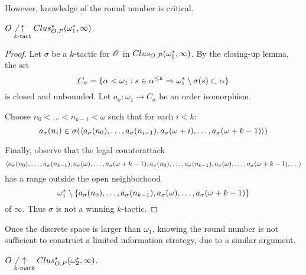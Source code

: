 However, knowledge of the round number is critical.

\begin{thm}
  $O\not\underset{k\text{-tact}}{\uparrow}Clus_{O,P}^\star(\omega^*_1,\infty)$.
\end{thm}

\begin{proof}
  Let $\sigma$ be a $k$-tactic for $\mathscr{O}$ in
  $Clus_{O,P}(\omega^*_1,\infty)$. By the closing-up lemma, the set
    \[
      C_\sigma
        =
      \{
        \alpha<\omega_1
          :
        s\in\alpha^{\leq k}
          \Rightarrow
        \omega^*_1\setminus\sigma(s)
        \subset \alpha
      \}
    \]
  is closed and unbounded. Let $a_\sigma:\omega_1\to C_\sigma$ be an order
  isomorphism.

  Choose $n_0<\dots<n_{k-1}<\omega$ such that for each $i<k$:
    \[
      a_\sigma(n_i)
        \in
      \sigma(
        \langle a_\sigma(n_0),\dots,a_\sigma(n_{i-1}),
          a_\sigma(\omega+i),\dots,a_\sigma(\omega+k-1)\rangle
      )
    \]

  Finally, observe that the legal counterattack
    \[
      \<a_\sigma(n_0),\dots,a_\sigma(n_{k-1}),
        a_\sigma(\omega),\dots,a_\sigma(\omega+k-1),
        a_\sigma(n_0),\dots,a_\sigma(n_{k-1}),
        a_\sigma(\omega),\dots,a_\sigma(\omega+k-1),
        \dots\>
    \]
  has a range outside the open neighborhood
    \[
      \omega^*_1
        \setminus
      \{a_\sigma(n_0),\dots,a_\sigma(n_{k-1}),
        a_\sigma(\omega),\dots,a_\sigma(\omega+k-1)\}
    \]
  of $\infty$. Thus $\sigma$ is not a winning $k$-tactic.
\end{proof}

Once the discrete space is larger than $\omega_1$, knowing the round number
is not sufficient to construct a limited information strategy, due to a
similar argument.

\begin{thm}
  $O\not\underset{k\text{-mark}}{\uparrow}Clus_{O,P}^\star(\omega^*_2,\infty)$.
\end{thm}

